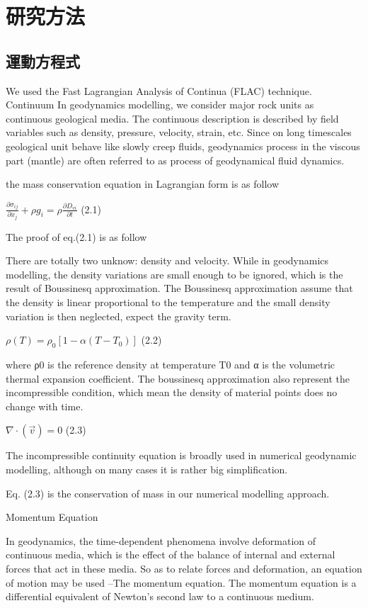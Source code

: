 
\chapter{研究方法}

\section{運動方程式}
We used the Fast Lagrangian Analysis of Continua (FLAC) technique.
Continuum
In geodynamics modelling, we consider major rock units as continuous geological media. The continuous description is described by field variables such as density, pressure, velocity, strain, etc. Since on long timescales geological unit behave like slowly creep fluids, geodynamics process in the viscous part (mantle) are often referred to as process of geodynamical fluid dynamics. 

the mass conservation equation in Lagrangian form is as follow

$\frac{\partial \sigma_{ij}}{\partial x_j}+\rho g_i = \rho \frac{\partial D_{vi}}{\partial t}$ (2.1)

The proof of eq.(2.1) is as follow

There are totally two unknow: density and velocity.
While in geodynamics modelling, the density variations are small enough to be ignored, which is the result of Boussinesq approximation. The Boussinesq approximation assume that the density is linear proportional to the temperature and the small density variation is then neglected, expect the gravity term.

$\rho (T) = \rho_0[1-\alpha (T-T_0)]$ (2.2)

where ρ0 is the reference density at temperature T0 and α is the volumetric thermal expansion coefficient. The boussinesq approximation also represent the incompressible condition, which mean the density of material points does no change with time. 

$\nabla \cdot (\vec v) = 0$ (2.3)

The incompressible continuity equation is broadly used in numerical geodynamic modelling, although on many cases it is rather big simplification. 


Eq. (2.3) is the conservation of mass in our numerical modelling approach.


Momentum Equation

In geodynamics, the time-dependent phenomena involve deformation of continuous media, which is the effect of the balance of internal and external forces that act in these media. So as to relate forces and deformation, an equation of motion may be used --The momentum equation. The momentum equation is a differential equivalent of Newton’s second law to a continuous medium.

